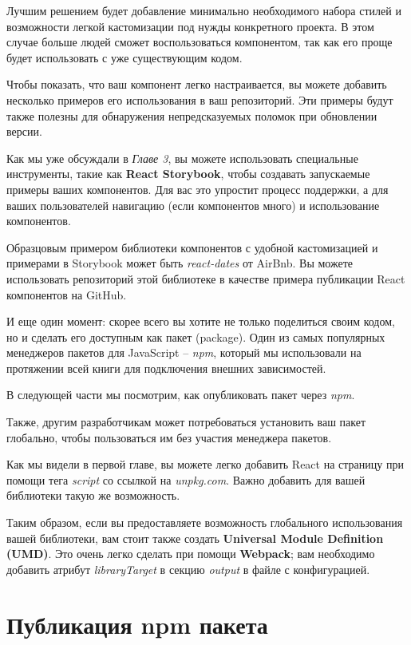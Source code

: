 Лучшим решением будет добавление минимально необходимого набора стилей и возможности легкой кастомизации под нужды конкретного проекта. В этом случае больше людей сможет воспользоваться компонентом, так как его проще будет использовать с уже существующим кодом.

Чтобы показать, что ваш компонент легко настраивается, вы можете добавить несколько примеров его использования в ваш репозиторий. Эти примеры будут также полезны для обнаружения непредсказуемых поломок при обновлении версии.

Как мы уже обсуждали в \textit{Главе 3}, вы можете использовать специальные инструменты, такие как \textbf{React Storybook}, чтобы создавать запускаемые примеры ваших компонентов. Для вас это упростит процесс поддержки, а для ваших пользователей навигацию (если компонентов много) и использование компонентов.

Образцовым примером библиотеки компонентов с удобной кастомизацией и примерами в Storybook может быть \textit{react-dates} от AirBnb. Вы можете использовать репозиторий этой библиотеке в качестве примера публикации React компонентов на GitHub.

И еще один момент: скорее всего вы хотите не только поделиться своим кодом, но и сделать его доступным как пакет (package). Один из самых популярных менеджеров пакетов для JavaScript -- \textit{npm}, который мы использовали на протяжении всей книги для подключения внешних зависимостей.

В следующей части мы посмотрим, как опубликовать пакет через \textit{npm}.
 
Также, другим разработчикам может потребоваться установить ваш пакет глобально, чтобы пользоваться им без участия менеджера пакетов.

Как мы видели в первой главе, вы можете легко добавить React на страницу при помощи тега \textit{script} со ссылкой на \textit{unpkg.com}. Важно добавить для вашей библиотеки такую же возможность.

Таким образом, если вы предоставляете возможность глобального использования вашей библиотеки, вам стоит также создать \textbf{Universal Module Definition (UMD)}. Это очень легко сделать при помощи \textbf{Webpack}; вам необходимо добавить атрибут \textit{libraryTarget} в секцию \textit{output} в файле с конфигурацией.

\section{Публикация npm пакета}

